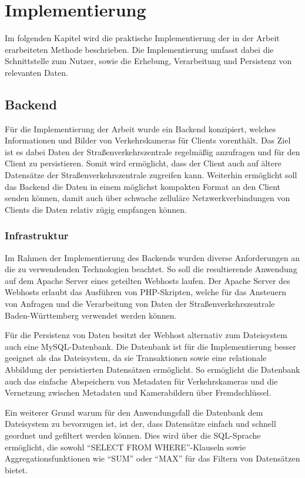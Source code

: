 \chapter{Implementierung}
Im folgenden Kapitel wird die praktische Implementierung der in der Arbeit erarbeiteten Methode beschrieben. Die Implementierung umfasst dabei die Schnittstelle zum Nutzer, sowie die Erhebung, Verarbeitung und Persistenz von relevanten Daten.
\section{Backend}
Für die Implementierung der Arbeit wurde ein Backend konzipiert, welches Informationen und Bilder von Verkehrskameras für Clients vorenthält. 
Das Ziel ist es dabei Daten der Straßenverkehrszentrale regelmäßig anzufragen und für den Client zu persistieren. 
Somit wird ermöglicht, dass der Client auch auf ältere Datensätze der Straßenverkehrszentrale zugreifen kann. 
Weiterhin ermöglicht soll das Backend die Daten in einem möglichst kompakten Format an den Client senden können, damit auch über schwache zelluläre Netzwerkverbindungen von Clients die Daten relativ zügig empfangen können. 
\subsection{Infrastruktur}
\label{sec:infrastructure}
Im Rahmen der Implementierung des Backends wurden diverse Anforderungen an die zu verwendenden Technologien beachtet. 
So soll die resultierende Anwendung auf dem Apache Server eines geteilten Webhosts laufen. 
Der Apache Server des Webhosts erlaubt das Ausführen von PHP-Skripten, welche für das Ansteuern von Anfragen und die Verarbeitung von Daten der Straßenverkehrszentrale Baden-Württemberg verwendet werden können. 

Für die Persistenz von Daten besitzt der Webhost alternativ zum Dateisystem auch eine MySQL-Datenbank.
Die Datenbank ist für die Implementierung besser geeignet als das Dateisystem, da sie Transaktionen sowie eine relationale Abbildung der persistierten Datensätzen ermöglicht.
So ermöglicht die Datenbank auch das einfache Abspeichern von Metadaten für Verkehrskameras und die Vernetzung zwischen Metadaten und Kamerabildern über Fremdschlüssel.

Ein weiterer Grund warum für den Anwendungsfall die Datenbank dem Dateisystem zu bevorzugen ist, ist der, dass Datensätze einfach und schnell geordnet und gefiltert werden können.
Dies wird über die SQL-Sprache ermöglicht, die sowohl "`SELECT FROM WHERE"'-Klauseln sowie Aggregationsfunktionen wie "`SUM"' oder "`MAX"' für das Filtern von Datensätzen bietet.

